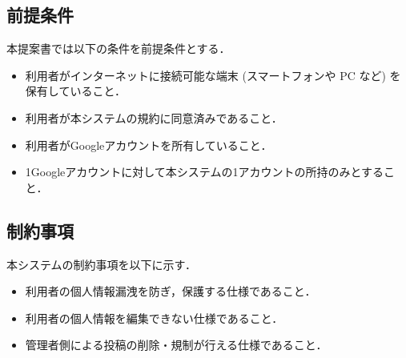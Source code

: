 \subsection{前提条件}
本提案書では以下の条件を前提条件とする．
\begin{itemize}
    \item 利用者がインターネットに接続可能な端末 (スマートフォンや PC など) を保有していること．
    \item 利用者が本システムの規約に同意済みであること．
    \item 利用者がGoogleアカウントを所有していること．
    \item 1Googleアカウントに対して本システムの1アカウントの所持のみとすること．
\end{itemize}

\subsection{制約事項}
本システムの制約事項を以下に示す．
\begin{itemize}
    \item 利用者の個人情報漏洩を防ぎ，保護する仕様であること．
    \item 利用者の個人情報を編集できない仕様であること．
    \item 管理者側による投稿の削除・規制が行える仕様であること．
\end{itemize}